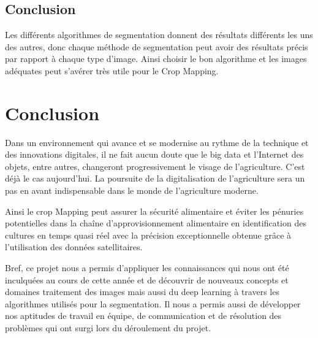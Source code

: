 \documentclass[12pt, openany]{report}
\begin{document}
\section*{Conclusion}
Les différents algorithmes de segmentation donnent des résultats différents les uns des autres, donc chaque méthode de segmentation peut avoir des résultats précis par rapport à chaque type d'image.
Ainsi choisir le bon algorithme et les images adéquates peut s'avérer très utile pour le Crop Mapping.


\chapter*{Conclusion}
Dans un environnement qui avance et se modernise au rythme de la technique et des innovations digitales, il ne fait aucun doute que le big data et l'Internet des objets, entre autres, changeront progressivement le visage de l'agriculture. C’est déjà le cas aujourd’hui. La poursuite de la digitalisation de l'agriculture sera un pas en avant indispensable dans le monde de l'agriculture moderne.
\par
Ainsi le crop Mapping peut assurer la sécurité alimentaire et éviter les pénuries potentielles dans la chaîne d'approvisionnement alimentaire en identification des cultures en temps quasi réel avec la précision exceptionnelle obtenue grâce à l'utilisation des données satellitaires.
\par
Bref, ce projet nous a permis d’appliquer les connaissances qui nous ont été inculquées au cours de cette année et de découvrir de nouveaux concepts et domaines traitement des images mais aussi du deep learning à travers les algorithmes utilisés pour la segmentation.
Il nous a permis aussi de développer nos aptitudes de travail en équipe, de communication et de résolution des problèmes qui ont surgi lors du déroulement du projet.



\end{document}

